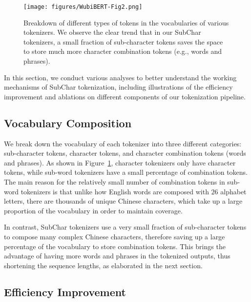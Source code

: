 \label{sec:analysis}

% 

\begin{figure}[t]
\centering
\texttt{[image: figures/WubiBERT-Fig2.png]}
\caption{Breakdown of different types of tokens in the vocabularies of various tokenizers. We observe the clear trend that in our SubChar tokenizers, a small fraction of sub-character tokens saves the space to store much more character combination tokens (e.g., words and phrases).}
\label{fig:composition}
\end{figure}


In this section, we conduct various analyses to better understand the working mechanisms of SubChar tokenization, including illustrations of the efficiency improvement and ablations on different components of our tokenization pipeline. 

\subsection{Vocabulary Composition}

We break down the vocabulary of each tokenizer into three different categories: sub-character tokens, character tokens, and character combination tokens (words and phrases). 
%
As shown in Figure~\ref{fig:composition}, character tokenizers only have character tokens, while sub-word tokenizers have a small percentage of combination tokens. The main reason for the relatively small number of combination tokens in sub-word tokenizers is that unlike how English words are composed with $26$ alphabet letters, there are thousands of unique Chinese characters, which take up a large proportion of the vocabulary in order to maintain coverage.

In contrast, SubChar tokenizers use a very small fraction of sub-character tokens to compose many complex Chinese characters, therefore saving up a large percentage of the vocabulary to store combination tokens. This brings the advantage of having more words and phrases in the tokenized outputs, thus shortening the sequence lengths, as elaborated in the next section.

\subsection{Efficiency Improvement}





